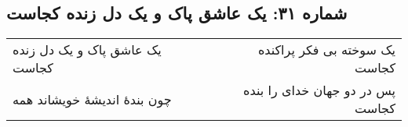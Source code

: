\begin{center}
\section*{شماره ۳۱: یک عاشق پاک و یک دل زنده کجاست}
\label{sec:031}
\begin{longtable}{l p{0.5cm} r}
یک عاشق پاک و یک دل زنده کجاست
&&
یک سوخته بی فکر پراکنده کجاست
\\
چون بندهٔ اندیشهٔ خویشاند همه
&&
پس در دو جهان خدای را بنده کجاست
\\
\end{longtable}
\end{center}
